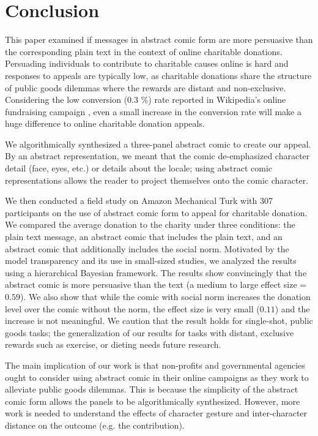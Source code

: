 \section{Conclusion}
\label{sec:Conclusion}

This paper examined if messages in abstract comic form are more persuasive than the corresponding plain text in the context of online charitable donations. Persuading individuals to contribute to charitable causes online is hard and responses to appeals are typically low, as charitable donations share the structure of public goods dilemmas where the rewards are distant and non-exclusive. Considering the low conversion (0.3 \%) rate reported in Wikipedia's online fundraising campaign \cite{wikimeta}, even a small increase in the conversion rate will make a huge difference to online charitable donation appeals. 

We algorithmically synthesized a three-panel abstract comic to create our appeal. By an abstract representation, we meant that the comic de-emphasized character detail (face, eyes, etc.) or details about the locale; using abstract comic representations allows the reader to project themselves onto the comic character. 

We then conducted a field study on Amazon Mechanical Turk with 307 participants on the use of abstract comic form to appeal for charitable donation. We compared the average donation to the charity under three conditions: the plain text message, an abstract comic that includes the plain text, and an abstract comic that additionally includes the social norm. Motivated by the model transparency and its use in small-sized studies, we analyzed the results using a hierarchical Bayesian framework. The results show convincingly that the abstract comic is more persuasive than the text (a medium to large effect size = $0.59$). We also show that while the comic with social norm increases the donation level over the comic without the norm, the effect size is very small ($0.11$) and the increase is not meaningful. We caution that the result holds for single-shot, public goods tasks; the generalization of our results for  tasks with distant, exclusive rewards such as exercise, or dieting needs future research. 

The main implication of our work is that non-profits and governmental agencies ought to consider using abstract comic in their online campaigns as they work to alleviate public goods dilemmas. This is because the simplicity of the abstract comic form allows the panels to be algorithmically synthesized. However, more work is needed to understand the effects of character gesture and inter-character distance on the outcome (e.g. the contribution).


